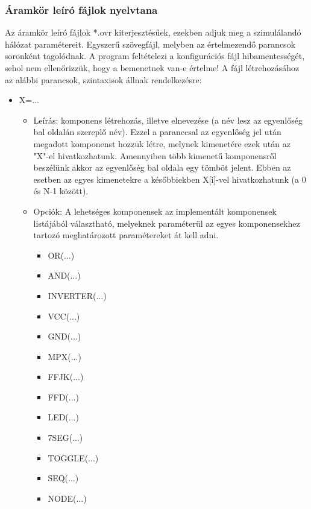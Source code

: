 \subsubsection{Áramkör leíró fájlok nyelvtana}
Az áramkör leíró fájlok *.ovr kiterjesztésűek, ezekben adjuk meg a szimulálandó hálózat paramétereit. Egyszerű szövegfájl, melyben az értelmezendő parancsok soronként tagolódnak. A program feltételezi a konfigurációs fájl hibamentességét, sehol nem ellenőrizzük, hogy a bemenetnek van-e értelme!\linebreak
A fájl létrehozásához az alábbi parancsok, szintaxisok állnak rendelkezésre:

\begin{itemize}
\item X=...
	\begin{itemize}
	\item Leírás: komponens létrehozás, illetve elnevezése (a név lesz az egyenlőség bal oldalán szereplő név). Ezzel a paranccsal az egyenlőség jel után megadott komponenst hozzuk létre, melynek kimenetére ezek után az "X"-el hivatkozhatunk. Amennyiben több kimenetű komponensről beszélünk akkor az egyenlőség bal oldala egy tömböt jelent. Ebben az esetben az egyes kimenetekre a későbbiekben X[i]-vel hivatkozhatunk (a 0 és N-1 között).
	\item Opciók: A lehetséges komponensek az implementált komponensek listájából választható, melyeknek paraméterül az egyes komponensekhez tartozó meghatározott paramétereket át kell adni.
		\begin{itemize}
			\item OR(...)			%
			\item AND(...)			%
			\item INVERTER(...)		%
			\item VCC(...)			%
			\item GND(...)			%
			\item MPX(...)			%
			\item FFJK(...)			%
			\item FFD(...)			%
			\item LED(...)			%
			\item 7SEG(...)			%
			\item TOGGLE(...)		%
			\item SEQ(...)			%
			\item NODE(...)			%
		\end{itemize}
	\end{itemize}


\end{itemize}
